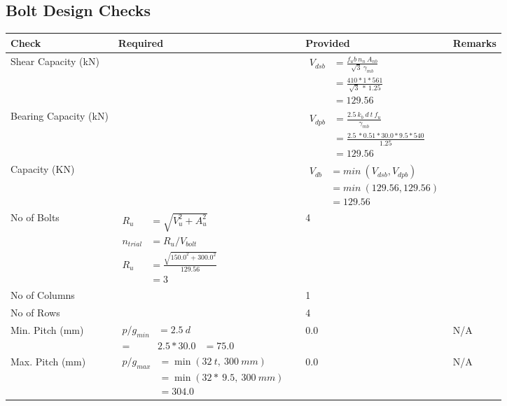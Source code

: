 \documentclass{article}%
\begin{document}
\subsection{Bolt Design Checks}%
\label{subsec:BoltDesignChecks}%
\renewcommand{\arraystretch}{1.2}%
\begin{longtable}{|p{4cm}|p{5cm}|p{5.5cm}|p{1.5cm}|}%
\hline%
\rowcolor{OsdagGreen}%
Check&Required&Provided&Remarks\\%
\hline%
\endhead%
\hline%
Shear Capacity (kN)&&$\begin{aligned}V_{dsb} &= \frac{f_ub ~n_n~ A_{nb}}{\sqrt{3} ~\gamma_{mb}}\\ &= \frac{410*1*561}{\sqrt{3}~*~1.25}\\ &= 129.56\end{aligned}$&\\%
\hline%
Bearing Capacity (kN)&&$\begin{aligned}V_{dpb} &= \frac{2.5~ k_b~ d~ t~ f_u}{\gamma_{mb}}\\ &= \frac{2.5~*0.51*30.0*9.5*540}{1.25}\\ &=129.56\end{aligned}$&\\%
\hline%
Capacity (KN)&&$\begin{aligned}V_{db} &= min~ (V_{dsb}, V_{dpb})\\ &= min~ (129.56,129.56)\\ &=129.56\end{aligned}$&\\%
\hline%
No of Bolts&$\begin{aligned}R_{u} &= \sqrt{V_u^2+A_u^2}\\ n_{trial} &= R_u/ V_{bolt}\\ R_{u} &= \frac{\sqrt{150.0^2+300.0^2}}{129.56}\\ &=3\end{aligned}$&4&\\%
\hline%
No of Columns&&1&\\%
\hline%
No of Rows&&4&\\%
\hline%
Min. Pitch (mm)&$\begin{aligned}p/g_{min}&= 2.5 ~ d&\\ =&2.5*30.0&=75.0\end{aligned}$&0.0&N/A\\%
\hline%
Max. Pitch (mm)&$\begin{aligned}p/g_{max} &=\min(32~t,~300~mm)&\\ &=\min(32 *~9.5,~ 300 ~mm)\\&=304.0\end{aligned}$&0.0&N/A\\%

\end{longtable}
\end{document}

